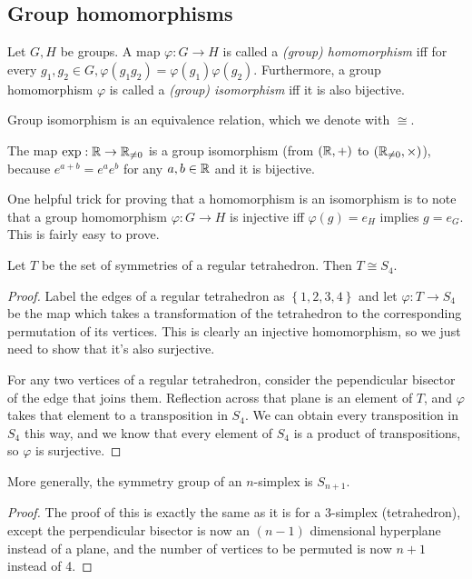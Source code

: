 \documentclass[class=article, crop=false]{standalone}
\begin{document}
\subsection{Group homomorphisms}
Let $G,H$ be groups. A map $\varphi: G \rightarrow H$ is called a \emph{(group) homomorphism} iff for every $g_1, g_2 \in G, \varphi(g_1g_2)=\varphi(g_1)\varphi(g_2)$. Furthermore, a group homomorphism $\varphi$ is called a \emph{(group) isomorphism} iff it is also bijective.
\par
Group isomorphism is an equivalence relation, which we denote with $\cong$.
\begin{example}
    The map $\exp: \mathbb{R} \rightarrow \mathbb{R}_{\neq 0}$ is a group isomorphism (from $(\mathbb{R}, +)$ to $(\mathbb{R}_{\neq 0}, \times)$), because $e^{a+b}=e^ae^b$ for any $a,b \in \mathbb{R}$ and it is bijective.
\end{example}
One helpful trick for proving that a homomorphism is an isomorphism is to note that a group homomorphism $\varphi: G \rightarrow H$ is injective iff $\varphi(g)=e_H$ implies $g=e_G$. This is fairly easy to prove.
\begin{thm}
    Let $T$ be the set of symmetries of a regular tetrahedron. Then $T \cong S_4$.
\end{thm}
\begin{proof}
    Label the edges of a regular tetrahedron as $ \left\{ 1,2,3,4 \right\}$ and let $\varphi: T \rightarrow S_4$ be the map which takes a transformation of the tetrahedron to the corresponding permutation of its vertices. This is clearly an injective homomorphism, so we just need to show that it's also surjective.
    \bigskip
    \par
    For any two vertices of a regular tetrahedron, consider the pependicular bisector of the edge that joins them. Reflection across that plane is an element of $T$, and $\varphi$ takes that element to a transposition in $S_4$. We can obtain every transposition in $S_4$ this way, and we know that every element of $S_4$ is a product of transpositions, so $\varphi$ is surjective.
\end{proof}
\begin{prop}
    More generally, the symmetry group of an $n$-simplex is $S_{n+1}$.
\end{prop}
\begin{proof}
    The proof of this is exactly the same as it is for a 3-simplex (tetrahedron), except the perpendicular bisector is now an $(n-1)$ dimensional hyperplane instead of a plane, and the number of vertices to be permuted is now $n+1$ instead of 4.
\end{proof}
\end{document}
